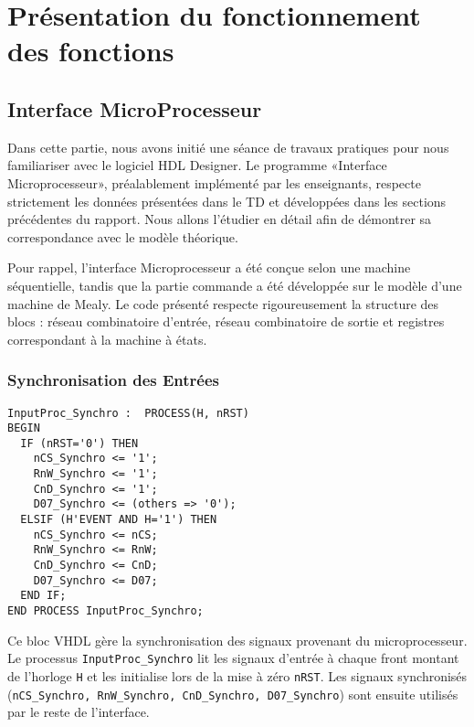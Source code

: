 \section{Présentation du fonctionnement des fonctions}

\subsection{Interface MicroProcesseur}

Dans cette partie, nous avons initié une séance de travaux pratiques pour nous familiariser avec 
le logiciel HDL Designer. Le programme «Interface Microprocesseur», préalablement implémenté par 
les enseignants, respecte strictement les données présentées dans le TD et développées dans les 
sections précédentes du rapport. Nous allons l’étudier en détail afin de démontrer sa correspondance 
avec le modèle théorique.
\newline

Pour rappel, l’interface Microprocesseur a été conçue selon une machine séquentielle, tandis que 
la partie commande a été développée sur le modèle d’une machine de Mealy. Le code présenté respecte 
rigoureusement la structure des blocs : réseau combinatoire d’entrée, réseau combinatoire de sortie 
et registres correspondant à la machine à états.
\newline

\subsubsection{Synchronisation des Entrées}

\begin{lstlisting}[style=VHDLStyle, caption={Reseau Cominatoire d'entrée}]
InputProc_Synchro :  PROCESS(H, nRST)
BEGIN
  IF (nRST='0') THEN 
    nCS_Synchro <= '1';
    RnW_Synchro <= '1';
    CnD_Synchro <= '1';
    D07_Synchro <= (others => '0');
  ELSIF (H'EVENT AND H='1') THEN
    nCS_Synchro <= nCS;
    RnW_Synchro <= RnW;
    CnD_Synchro <= CnD;
    D07_Synchro <= D07;
  END IF;
END PROCESS InputProc_Synchro;
\end{lstlisting}

Ce bloc VHDL gère la synchronisation des signaux provenant du microprocesseur. Le processus \texttt{InputProc\_Synchro} lit les signaux d’entrée à chaque front montant de l’horloge \texttt{H} et les initialise lors de la mise à zéro \texttt{nRST}. Les signaux synchronisés (\texttt{nCS\_Synchro, RnW\_Synchro, CnD\_Synchro, D07\_Synchro}) sont ensuite utilisés par le reste de l’interface.

